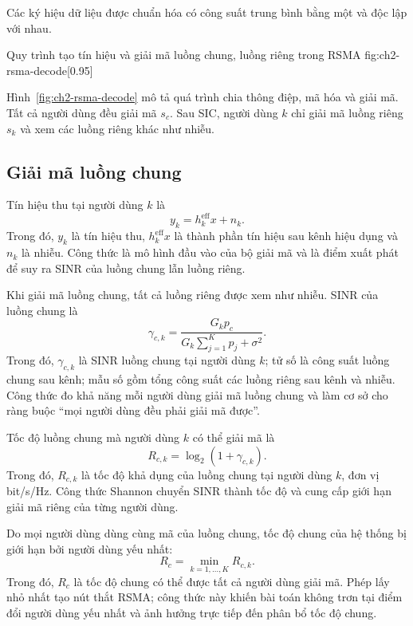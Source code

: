 Các ký hiệu dữ liệu được chuẩn hóa có công suất trung bình bằng một và độc lập với nhau.

{Quy trình tạo tín hiệu và giải mã luồng chung, luồng riêng trong RSMA}
{fig:ch2-rsma-decode}[0.95\linewidth]

Hình~\ref{fig:ch2-rsma-decode} mô tả quá trình chia thông điệp, mã hóa và giải mã. Tất cả người dùng đều giải mã $s_c$. Sau SIC, người dùng $k$ chỉ giải mã luồng riêng $s_k$ và xem các luồng riêng khác như nhiễu.

\subsection{Giải mã luồng chung}
Tín hiệu thu tại người dùng $k$ là
\begin{equation}
 y_k=h_k^{\mathrm{eff}}x+n_k.
\end{equation}
Trong đó, $y_k$ là tín hiệu thu, $h_k^{\mathrm{eff}}x$ là thành phần tín hiệu sau kênh hiệu dụng và $n_k$ là nhiễu. Công thức là mô hình đầu vào của bộ giải mã và là điểm xuất phát để suy ra SINR của luồng chung lẫn luồng riêng.

Khi giải mã luồng chung, tất cả luồng riêng được xem như nhiễu. SINR của luồng chung là
\begin{equation}
 \gamma_{c,k}=\frac{G_kp_c}{G_k\sum_{j=1}^{K}p_j+\sigma^2}.
 \label{eq:common-sinr-ch2}
\end{equation}
Trong đó, $\gamma_{c,k}$ là SINR luồng chung tại người dùng $k$; tử số là công suất luồng chung sau kênh; mẫu số gồm tổng công suất các luồng riêng sau kênh và nhiễu. Công thức đo khả năng mỗi người dùng giải mã luồng chung và làm cơ sở cho ràng buộc ``mọi người dùng đều phải giải mã được''.

Tốc độ luồng chung mà người dùng $k$ có thể giải mã là
\begin{equation}
 R_{c,k}=\log_2(1+\gamma_{c,k}).
\end{equation}
Trong đó, $R_{c,k}$ là tốc độ khả dụng của luồng chung tại người dùng $k$, đơn vị bit/s/Hz. Công thức Shannon chuyển SINR thành tốc độ và cung cấp giới hạn giải mã riêng của từng người dùng.

Do mọi người dùng dùng cùng mã của luồng chung, tốc độ chung của hệ thống bị giới hạn bởi người dùng yếu nhất:
\begin{equation}
 R_c=\min_{k=1,\ldots,K}R_{c,k}.
 \label{eq:common-rate-min-ch2}
\end{equation}
Trong đó, $R_c$ là tốc độ chung có thể được tất cả người dùng giải mã. Phép lấy nhỏ nhất tạo nút thắt RSMA; công thức này khiến bài toán không trơn tại điểm đổi người dùng yếu nhất và ảnh hưởng trực tiếp đến phân bổ tốc độ chung.


